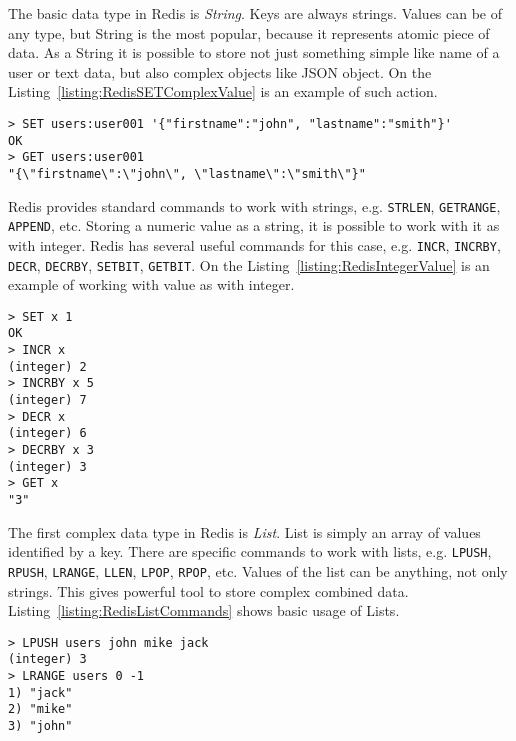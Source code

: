 

The basic data type in Redis is \textit{String}.
Keys are always strings.
Values can be of any type, but String is the most popular, because it represents atomic piece of data.
As a String it is possible to store not just something simple like name of a user or text data, but also complex objects like JSON object.
On the Listing~\ref{listing:RedisSETComplexValue} is an example of such action.

\begin{lstlisting}[float=h, caption=Usage of SET command with complex value., label=listing:RedisSETComplexValue]
> SET users:user001 '{"firstname":"john", "lastname":"smith"}'
OK
> GET users:user001
"{\"firstname\":\"john\", \"lastname\":\"smith\"}"
\end{lstlisting}

Redis provides standard commands to work with strings, e.g. \lstinline{STRLEN}, \lstinline{GETRANGE}, \lstinline{APPEND}, etc.
Storing a numeric value as a string, it is possible to work with it as with integer.
Redis has several useful commands for this case, e.g. \lstinline{INCR}, \lstinline{INCRBY}, \lstinline{DECR}, \lstinline{DECRBY}, \lstinline{SETBIT}, \lstinline{GETBIT}.
On the Listing~\ref{listing:RedisIntegerValue} is an example of working with value as with integer.

\begin{lstlisting}[float=h, caption=Working with value as with integer., label=listing:RedisIntegerValue]
> SET x 1
OK
> INCR x
(integer) 2
> INCRBY x 5
(integer) 7
> DECR x
(integer) 6
> DECRBY x 3
(integer) 3
> GET x
"3"
\end{lstlisting}

The first complex data type in Redis is \textit{List}.
List is simply an array of values identified by a key.
There are specific commands to work with lists, e.g. \lstinline{LPUSH}, \lstinline{RPUSH}, \lstinline{LRANGE}, \lstinline{LLEN}, \lstinline{LPOP}, \lstinline{RPOP}, etc.
Values of the list can be anything, not only strings.
This gives powerful tool to store complex combined data.
Listing~\ref{listing:RedisListCommands} shows basic usage of Lists.

\begin{lstlisting}[float=h, caption=Usage of List data type commands., label=listing:RedisListCommands]
> LPUSH users john mike jack
(integer) 3
> LRANGE users 0 -1
1) "jack"
2) "mike"
3) "john"
\end{lstlisting}


